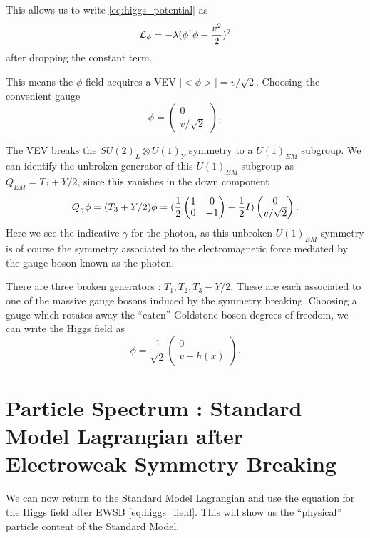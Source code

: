This allows us to write \ref{eq:higgs_potential} as
\begin{equation} \label{eq:higgs_potential_rewritten}
\mathcal{L}_\phi = - \lambda (\phi^\dagger \phi - \frac{v^2}{2})^2
\end{equation}
after dropping the constant term.

This means the $\phi$ field acquires a VEV $|<\phi>| = v/\sqrt{2}$.
Choosing the convenient gauge
\begin{equation}
\phi = \begin{pmatrix} 0 \\ v/\sqrt{2} \end{pmatrix},
\end{equation}

The VEV breaks the $SU(2)_L \otimes U(1)_Y$ symmetry to a $U(1)_{EM}$ subgroup.
We can identify the unbroken generator of this $U(1)_{EM}$ subgroup as $Q_{EM} = T_3 + Y/2$, since this vanishes in the down component
\begin{equation}
Q_{\gamma} \phi = (T_3 + Y/2) \phi = (\frac{1}{2} \begin{pmatrix} 1 & 0 \\ 0 & -1 \end{pmatrix} + \frac{1}{2} I ) \begin{pmatrix} 0 \\ v/\sqrt{2} \end{pmatrix}.
\end{equation}
Here we see the indicative $\gamma$ for the photon, as this unbroken $U(1)_{EM}$ symmetry is of course the symmetry associated to the electromagnetic force mediated by the gauge boson known as the photon.

There are three broken generators : $T_1, T_2, T_3 - Y/2$.
These are each associated to one of the massive gauge bosons induced by the symmetry breaking.
Choosing a gauge which rotates away the ``eaten'' Goldstone boson degrees of freedom, we can write the Higgs field as
\begin{equation}
\label{eq:higgs_field}
\phi = \frac{1}{\sqrt{2}}\begin{pmatrix} 0 \\ v + h(x) \end{pmatrix}.
\end{equation}

\section{Particle Spectrum : Standard Model Lagrangian after Electroweak Symmetry Breaking}

We can now return to the Standard Model Lagrangian and use the equation for the Higgs field after EWSB \ref{eq:higgs_field}.
This will show us the ``physical'' particle content of the Standard Model.

